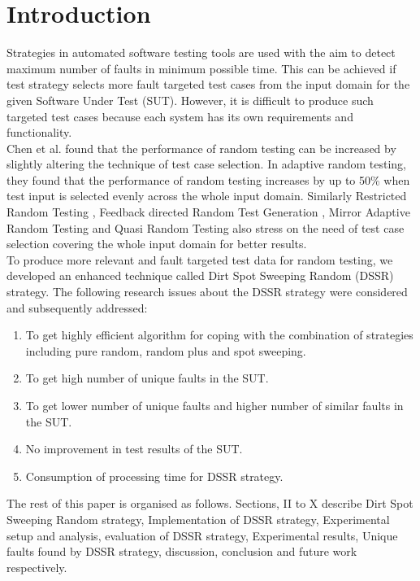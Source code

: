 \documentclass[conference]{IEEEtran}
\begin{document}
\section{Introduction}
Strategies in automated software testing tools are used with the aim to detect maximum number of faults in minimum possible time. This can be achieved if test strategy selects more fault targeted test cases from the input domain for the given Software Under Test (SUT). However, it is difficult to produce such targeted test cases because each system has its own requirements and functionality.\\
\indent Chen et al.  \cite{Chen2008} found that the performance of random testing can be increased by slightly altering the technique of test case selection. In adaptive random testing, they found that the performance of random testing increases by up to 50\% when test input is selected evenly across the whole input domain. Similarly Restricted Random Testing \cite{Chan2002}, Feedback directed Random Test Generation \cite{Pacheco2007a}, Mirror Adaptive Random Testing \cite{Chen2003} and Quasi Random Testing \cite{Chen2005} also stress on the need of test case selection covering the whole input domain for better results. \\
\indent To produce more relevant and fault targeted test data for random testing, we developed an enhanced technique called Dirt Spot Sweeping Random (DSSR) strategy.  The following research issues about the DSSR strategy were considered and subsequently addressed:
\begin{enumerate}

\item To get highly efficient algorithm for coping with the combination of strategies including pure random, random plus and spot sweeping.

\item To get high number of unique faults in the SUT. 

\item To get  lower number of unique faults and higher number of similar faults in the SUT.

\item  No improvement in test results of the SUT. 

\item  Consumption of processing time for DSSR strategy.

\end{enumerate}
The rest of this paper is organised as follows. Sections, II to X describe Dirt Spot Sweeping Random strategy, Implementation of DSSR strategy, Experimental setup and analysis, evaluation of DSSR strategy, Experimental results, Unique faults found by DSSR strategy, discussion, conclusion and future work respectively.
\end{document}
